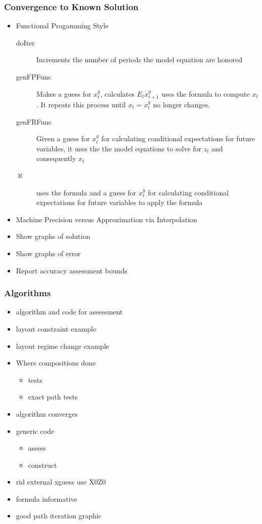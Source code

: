\documentclass[letter]{beamer}
\begin{document}
\begin{frame}
  \frametitle{Convergence to Known Solution }
  \begin{itemize}
  \item Functional Progamming Style
    \begin{description}
\item[doIter] Increments the number of periods the model equation are honored
\item[genFPFunc] Makes a guess for $x^g_t$, calculates $E_t x^g_{t+1}$ uses the 
formula  to compute $x_t$.  It repeats this process until 
$x_t=x^g_t$ no longer changes.
\item[genFRFunc] Given a guess for $x^g_t$ for calculating conditional expectations for future variables, it uses the the model equations  to solve for $z_t$
and consequently $x_t$
\item[ $\aleph$] uses the formula and a guess for $x^g_t$ for calculating conditional expectations for future variables to apply the formula 
    \end{description}
 \item  Machine Precision versus Approximation via  Interpolation
  \item Show graphs of solution
  \item Show graphs of error
  \item Report accuracy assessment bounds
  \end{itemize}
\end{frame}

\begin{frame}
    \frametitle{Algorithms}
    \begin{itemize}
    \item algorithm and code for assessment
    \item layout constraint example
    \item layout regime change example
    \end{itemize}

\end{frame}

\begin{frame}
  \begin{itemize}
  \item Where compositions done
    \begin{itemize}
    \item tests
    \item exact path tests
    \end{itemize}
  \item algorithm converges
  \item generic code 
    \begin{itemize}
    \item assess
  \item construct
    \end{itemize}
  \item rid external xguess use X0Z0
  \item formula informative
  \item good path iteration graphic
  \end{itemize}
\end{frame}
\end{document}
